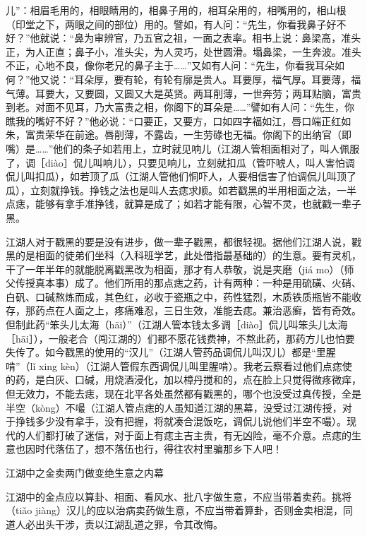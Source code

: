 \documentclass[12pt,UTF8]{ctexbook}
\begin{document}
儿”：相眉毛用的，相眼睛用的，相鼻子用的，相耳朵用的，相嘴用的，相山根（印堂之下，两眼之间的部位）用的。譬如，有人问：“先生，你看我鼻子好不好？”他就说：“鼻为审辨官，乃五官之祖，一面之表率。相书上说：鼻梁高，准头正，为人正直；鼻子小，准头尖，为人灵巧，处世圆滑。塌鼻梁，一生奔波。准头不正，心地不良，像你老兄的鼻子主于……”又如有人问：“先生，你看我耳朵如何？”他又说：“耳朵厚，要有轮，有轮有廓是贵人。耳要厚，福气厚。耳要薄，福气薄。耳要大，又要圆，又圆又大是英贤。两耳削薄，一世奔劳；两耳贴脑，富贵到老。对面不见耳，乃大富贵之相，你阁下的耳朵是……”譬如有人问：“先生，你瞧我的嘴好不好？”他必说：“口要正，又要方，口如四字福如江，唇口端正红如朱，富贵荣华在前途。唇削薄，不露齿，一生劳碌也无福。你阁下的出纳官（即嘴）是……”他们的条子如若用上，立时就见响儿（江湖人管相面相对了，叫人佩服了，调［diào］侃儿叫响儿），只要见响儿，立刻就扣瓜（管吓唬人，叫人害怕调侃儿叫扣瓜），如若顶了瓜（江湖人管他们恫吓人，人要相信害了怕调侃儿叫顶了瓜），立刻就挣钱。挣钱之法也是叫人去痣求顺。如若戳黑的半用相面之法，一半点痣，能够有拿手准挣钱，就算是成了；如若才能有限，心智不灵，也就戳一辈子黑。

江湖人对于戳黑的要是没有进步，做一辈子戳黑，都很轻视。据他们江湖人说，戳黑的是相面的徒弟们坐科（入科班学艺，此处借指最基础的）的生意。要有灵机，干了一年半年的就能脱离戳黑改为相面，那才有人恭敬，说是夹磨（jiá mo）（师父传授真本事）成了。他们所用的那点痣之药，计有两种：一种是用硫磺、火硝、白矾、口碱熬炼而成，其色红，必收于瓷瓶之中，药性猛烈，木质铁质瓶皆不能收存，那药点在人面之上，疼痛难忍，三日生效，准能去痣。兼治恶癣，皆有奇效。但制此药“笨头儿太海（hāi）”（江湖人管本钱太多调［diào］侃儿叫笨头儿太海［hāi］），一般老合（闯江湖的）们都不愿花钱费神，不熬此药，那药方儿也怕要失传了。如今戳黑的使用的“汉儿”（江湖人管药品调侃儿叫汉儿）都是“里腥啃”（lǐ xing kèn）（江湖人管假东西调侃儿叫里腥啃）。我老云察看过他们点痣使的药，是白灰、口碱，用烧酒浸化，加以樟丹搅和的，点在脸上只觉得微疼微痒，但无效力，不能去痣，现在北平各处虽然都有戳黑的，哪个也没受过真传授，全是半空（kòng）不嘬（江湖人管点痣的人虽知道江湖的黑幕，没受过江湖传授，对于挣钱多少没有拿手，没有把握，将就凑合混饭吃，调侃儿说他们半空不嘬）。现代的人们都打破了迷信，对于面上有痣主吉主贵，有无凶险，毫不介意。点痣的生意也因时代落伍了，想不落伍也行，得往农村里骗那乡下人吧！





江湖中之金卖两门做变绝生意之内幕


江湖中的金点应以算卦、相面、看风水、批八字做生意，不应当带着卖药。挑将（tiǎo jiàng）汉儿的应以治病卖药做生意，不应当带着算卦，否则金卖相混，同道人必出头干涉，责以江湖乱道之罪，令其改悔。
\end{document}
